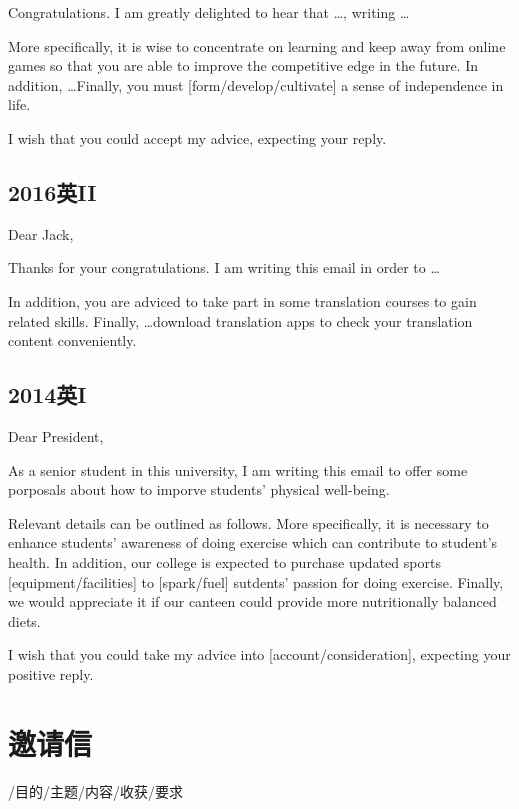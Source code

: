 Congratulations. I am greatly delighted to hear that \dots, writing \dots 

More specifically, it is wise to concentrate on learning and keep away from 
online games so that you are able to improve the competitive edge in the future.
In addition, \dots Finally, you must [form/develop/cultivate] a sense of independence in life.

I wish that you could accept my advice, expecting your reply.

\YSLM

\section{2016英II}

\noindent Dear Jack,

Thanks for your congratulations. I am writing this email in order to \dots

In addition, you are adviced to take part in some translation courses to gain related skills.
Finally, \dots download translation apps to check your translation content conveniently.

\section{2014英I}

\noindent Dear President, 

As a senior student in this university, I am writing this email to offer some porposals about how to 
imporve students' physical well-being.

Relevant details can be outlined as follows. More specifically, it is necessary to enhance students'
awareness of doing exercise which can contribute to student's health. 
In addition, our college is expected to purchase updated sports [equipment/facilities] to [spark/fuel] 
sutdents' passion for doing exercise. 
Finally, we would appreciate it if our canteen could provide more nutritionally balanced diets.

I wish that you could take my advice into [account/consideration], expecting your positive reply.

\YSLM

\chapter{邀请信}

\noindent {}/目的/主题/内容/收获/要求

